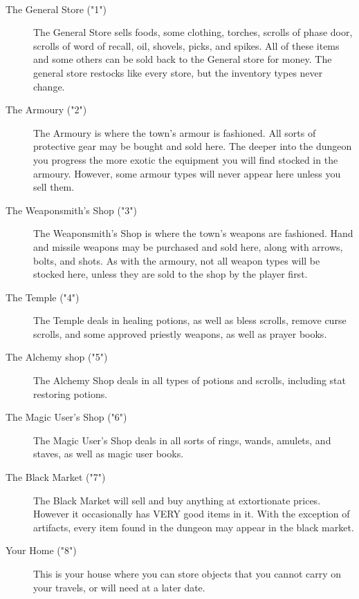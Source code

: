 \paragraph{}
\begin{description}
\item[The General Store ("1")]
     The General Store sells foods, some clothing, torches, scrolls
     of phase door, scrolls of word of recall, oil, shovels, picks,
     and spikes. All of these items and some others can be sold
     back to the General store for money. The general store restocks
     like every store, but the inventory types never change.

\item[The Armoury ("2")]
     The Armoury is where the town's armour is fashioned. All sorts of
     protective gear may be bought and sold here. The deeper into the
     dungeon you progress the more exotic the equipment you will find stocked
     in the armoury. However, some armour types will never appear here
     unless you sell them.

\item[The Weaponsmith's Shop ("3")]
     The Weaponsmith's Shop is where the town's weapons are fashioned. Hand
     and missile weapons may be purchased and sold here, along with arrows,
     bolts, and shots. As with the armoury, not all weapon types will be
     stocked here, unless they are sold to the shop by the player first.

\item[The Temple ("4")]
     The Temple deals in healing potions, as well as bless scrolls, remove
     curse scrolls, and some approved priestly weapons, as well as prayer
     books.

\item[The Alchemy shop ("5")]
     The Alchemy Shop deals in all types of potions and scrolls, including
     stat restoring potions.

\item[The Magic User's Shop ("6")]
     The Magic User's Shop deals in all sorts of rings, wands, amulets, and
     staves, as well as magic user books.

\item[The Black Market ("7")]
     The Black Market will sell and buy anything at extortionate prices.
     However it occasionally has VERY good items in it. With the exception
     of artifacts, every item found in the dungeon may appear in the black
     market.

\item[Your Home ("8")]
     This is your house where you can store objects that you
     cannot carry on your travels, or will need at a later date.
\end{description}

